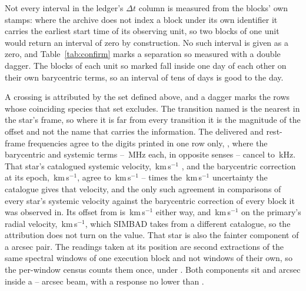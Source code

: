 Not every interval in the ledger's $\Delta t$ column is measured from the
blocks' own stamps: where the archive does not index a block under its own
identifier it carries the earliest start time of its observing unit, so two
blocks of one unit would return an interval of zero by construction. No such
interval is given as a zero, and Table~\ref{tab:confirm} marks a separation
so measured with a double dagger. The blocks of each unit so marked fall
inside one day of each other on their own barycentric terms, so an interval of
tens of days is good to the day.

A crossing is attributed by the set defined above, and a dagger marks the
\MkNSODecide{} rows whose coinciding species that set excludes. The
transition named is the nearest in the star's frame, so where it is far from
every transition it is the magnitude of the offset and not the name that
carries the information. The delivered and rest-frame frequencies agree to
the digits printed in one row only, \MkCancStar, where the barycentric and
systemic terms -- \MkCancBaryMHz\,MHz each, in opposite senses -- cancel to
\MkCancNetkHz\,kHz. That star's catalogued systemic velocity,
\MkCancVSys\,km\,s$^{-1}$ \citep{ZunigaFernandez2021}, and the
barycentric correction at its epoch,
\MkCancVBary\,km\,s$^{-1}$, agree to \VsAgreeKms\,km\,s$^{-1}$ --
\VsRvRatio{} times the \VsRvErr\,km\,s$^{-1}$ uncertainty the catalogue
gives that velocity, and the only
such agreement in \VsNComp{} comparisons of every star's systemic velocity
against the barycentric correction of every block it was observed in. Its
offset from \MkCancLine{} is \MkCancDv\,km\,s$^{-1}$ either way, and
\VsPrimDv\,km\,s$^{-1}$ on the primary's radial velocity,
\VsPrimV\,km\,s$^{-1}$, which SIMBAD takes from a different catalogue, so
the attribution does not turn on the value. That star is also the fainter component
of a \CenPairSep{} arcsec pair. The
\CenPairNWin{} readings taken at its position are second extractions of the
same \CenPairNWin{} spectral windows of one execution block and not windows
of their own, so the per-window census counts them once, under
\CenPairNameA. Both components sit \CenPairOffA{} and \CenPairOffB{} arcsec
inside a \CenPairPbFwhmLo--\CenPairPbFwhmHi{} arcsec beam, with a response no
lower than \CenPairPbRespLo.

